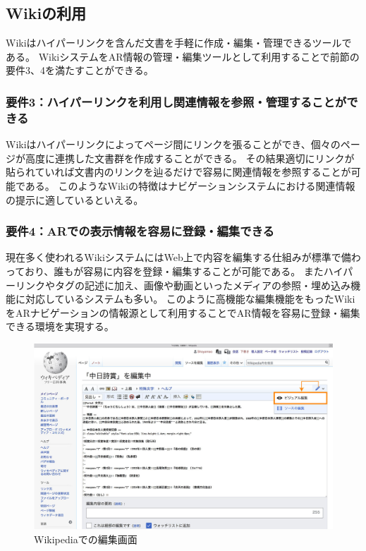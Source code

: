 \subsection{Wikiの利用}
Wikiはハイパーリンクを含んだ文書を手軽に作成・編集・管理できるツールである。
WikiシステムをAR情報の管理・編集ツールとして利用することで前節の要件3、4を満たすことができる。

\subsubsection*{要件3：ハイパーリンクを利用し関連情報を参照・管理することができる}
Wikiはハイパーリンクによってページ間にリンクを張ることができ、個々のページが高度に連携した文書群を作成することができる。
その結果適切にリンクが貼られていれば文書内のリンクを辿るだけで容易に関連情報を参照することが可能である。
このようなWikiの特徴はナビゲーションシステムにおける関連情報の提示に適しているといえる。

\subsubsection*{要件4：ARでの表示情報を容易に登録・編集できる}
現在多く使われるWikiシステムにはWeb上で内容を編集する仕組みが標準で備わっており、誰もが容易に内容を登録・編集することが可能である。
またハイパーリンクやタグの記述に加え、画像や動画といったメディアの参照・埋め込み機能に対応しているシステムも多い。
このように高機能な編集機能をもったWikiをARナビゲーションの情報源として利用することでAR情報を容易に登録・編集できる環境を実現する。

\begin{figure}[H]
  \centering
  \includegraphics[width=120mm]{images/wikipedia_edit.png}
  \caption{Wikipediaでの編集画面} \label{fig:wikipedia_edit}
\end{figure}

